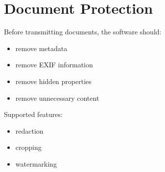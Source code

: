 
\chapter{Document Protection}

Before transmitting documents, the software should:
\begin{itemize}
	\item remove metadata
	\item remove EXIF information
	\item remove hidden properties
	\item remove unnecessary content
\end{itemize}

Supported features:

\begin{itemize}
	\item redaction
	\item cropping
	\item watermarking
\end{itemize}

\sentinelchapterend
